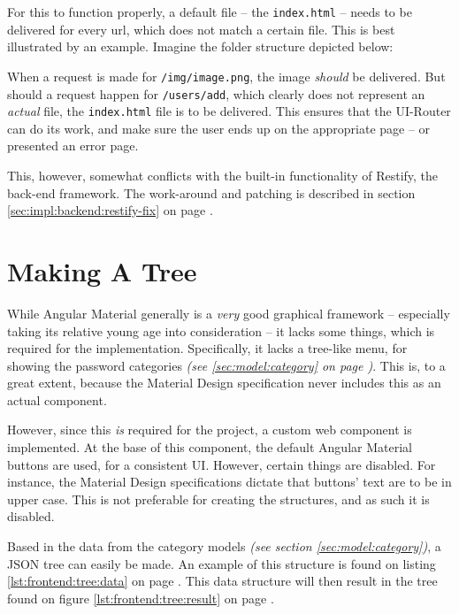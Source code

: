 		For this to function properly, a default file -- the \verb=index.html= -- needs to be delivered for every url, which does not match a certain file. This is best illustrated by an example. Imagine the folder structure depicted below:

		When a request is made for \verb=/img/image.png=, the image \emph{should} be delivered. But should a request happen for \verb=/users/add=, which clearly does not represent an \emph{actual} file, the \verb=index.html= file is to be delivered. This ensures that the UI-Router can do its work, and make sure the user ends up on the appropriate page -- or presented an error page.

		This, however, somewhat conflicts with the built-in functionality of Restify, the back-end framework. The work-around and patching is described in section \ref{sec:impl:backend:restify-fix} on page \pageref{sec:impl:backend:restify-fix}.

	\section{Making A Tree}
		While Angular Material generally is a \emph{very} good graphical framework -- especially taking its relative young age into consideration -- it lacks some things, which is required for the implementation. Specifically, it lacks a tree-like menu, for showing the password categories \emph{(see \ref{sec:model:category} on page \pageref{sec:model:category})}. This is, to a great extent, because the Material Design specification never includes this as an actual component. 

		However, since this \emph{is} required for the project, a custom web component is implemented. At the base of this component, the default Angular Material buttons are used, for a consistent UI. However, certain things are disabled. For instance, the Material Design specifications dictate that buttons' text are to be in upper case. This is not preferable for creating the structures, and as such it is disabled.

		Based in the data from the category models \emph{(see section \ref{sec:model:category})}, a JSON tree can easily be made. An example of this structure is found on listing \ref{lst:frontend:tree:data} on page \pageref{lst:frontend:tree:data}. This data structure will then result in the tree found on figure \ref{lst:frontend:tree:result} on page \pageref{lst:frontend:tree:result}.

